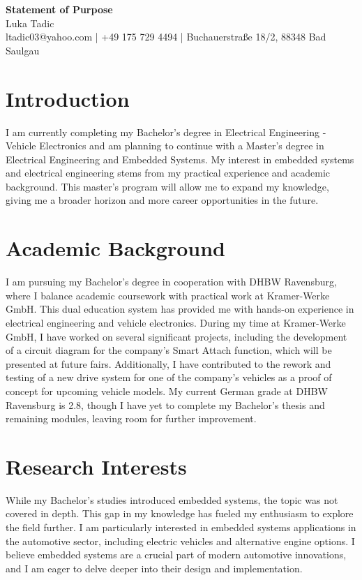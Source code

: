 \documentclass[11pt,a4paper]{article}
\begin{document}
\begin{center}
    {\Large \textbf{Statement of Purpose}}\\[10pt]
    {\large Luka Tadic}\\[5pt]
    {\normalsize ltadic03@yahoo.com | +49 175 729 4494 | Buchauerstraße 18/2, 88348 Bad Saulgau}
\end{center}

\section*{Introduction}
I am currently completing my Bachelor's degree in Electrical Engineering - Vehicle Electronics and am planning to continue with a Master's degree in Electrical Engineering and Embedded Systems. My interest in embedded systems and electrical engineering stems from my practical experience and academic background. This master's program will allow me to expand my knowledge, giving me a broader horizon and more career opportunities in the future.

\section*{Academic Background}
I am pursuing my Bachelor's degree in cooperation with DHBW Ravensburg, where I balance academic coursework with practical work at Kramer-Werke GmbH. This dual education system has provided me with hands-on experience in electrical engineering and vehicle electronics. During my time at Kramer-Werke GmbH, I have worked on several significant projects, including the development of a circuit diagram for the company's Smart Attach function, which will be presented at future fairs. Additionally, I have contributed to the rework and testing of a new drive system for one of the company's vehicles as a proof of concept for upcoming vehicle models. My current German grade at DHBW Ravensburg is 2.8, though I have yet to complete my Bachelor's thesis and remaining modules, leaving room for further improvement.

\section*{Research Interests}
While my Bachelor's studies introduced embedded systems, the topic was not covered in depth. This gap in my knowledge has fueled my enthusiasm to explore the field further. I am particularly interested in embedded systems applications in the automotive sector, including electric vehicles and alternative engine options. I believe embedded systems are a crucial part of modern automotive innovations, and I am eager to delve deeper into their design and implementation.
\end{document}
